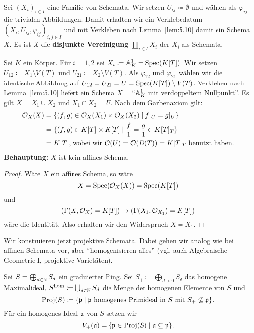 \begin{bsp}
\label{bsp:5.12}
	Sei $(X_i)_{i\in I}$ eine Familie von Schemata. Wir setzen $U_{ij}\coloneqq \emptyset$ und wählen als $\varphi_{ij}$ die trivialen Abbildungen. Damit erhalten wir ein Verklebedatum $(X_i,U_{ij},\varphi_{ij})_{i,j\in I}$ und mit Verkleben nach Lemma~\ref{lem:5.10} damit ein Schema $X$. Es ist $X$ die \textbf{disjunkte Vereinigung} $\coprod_{i\in I}X_i$ der $X_i$ als Schemata.
\end{bsp}

\begin{bsp}
\label{bsp:5.13}
	Sei $K$ ein Körper. Für $i=1,2$ sei $X_i\coloneqq \mathbb {A}^1_K = \operatorname{Spec}(K[T])$. Wir setzen $U_{12} \coloneqq X_1 \setminus V(T)$ und $U_{21}\coloneqq X_2 \setminus V(T)$. Als $\varphi_{12}$ und $\varphi_{21}$ wählen wir die identische Abbildung auf $U_{12} = U_{21} = U = \operatorname{Spec}(K[T]) \setminus V(T)$. Verkleben nach Lemma~\ref{lem:5.10} liefert ein Schema $X=$\enquote{$\mathbb {A}^1_K$ mit verdoppeltem Nullpunkt}. Es gilt $X= X_1 \cup X_2$ und $X_1 \cap X_2 = U$. Nach dem Garbenaxiom gilt:
	\begin{align*}
		\mathcal{O}_X(X) &= \{(f,g) \in \mathcal{O}_X(X_1)\times \mathcal{O}_X(X_2) \mid f\vert_U = g\vert_U\}\\
		&=\{(f,g) \in K[T] \times K[T] \mid \frac{f}{1} = \frac{g}{1} \in K[T]_T\}\\
		&= K[T]\text{, wobei wir } \mathcal{O}(U) = \mathcal{O}(D(T)) = K[T]_T \text{ benutzt haben.}
	\end{align*}
	\textbf{Behauptung:} $X$ ist kein affines Schema.
	\begin{proof}
		Wäre $X$ ein affines Schema, so wäre
		\[
			X = \operatorname{Spec}(\mathcal{O}_X(X)) = \operatorname{Spec}(K[T])
		\]
		und
		\[
			(\Gamma(X,\mathcal{O}_X) = K[T]) \to (\Gamma(X_1,\mathcal{O}_{X_1}) = K[T])
		\]
		wäre die Identität. Also erhalten wir den Widerspruch $X = X_1$.
	\end{proof}
\end{bsp}

Wir konstruieren jetzt projektive Schemata. Dabei gehen wir analog wie bei affinen Schemata vor, aber \enquote{homogenisieren alles} (vgl. auch Algebraische Geometrie I, projektive Varietäten).

\begin{defn}
\label{defn:5.14}
	Sei $S = \bigoplus_{d\in \mathbb {N}} S_d$ ein graduierter Ring. Sei $S_+ \coloneqq \bigoplus_{d > 0}S_d$ das homogene Maximalideal, $S^{\text{hom}}\coloneqq \bigcup_{d\in \mathbb {N}}S_d$ die Menge der homogenen Elemente von $S$ und
	\[
		\operatorname{Proj}(S) \coloneqq \{\mathfrak{p} \mid \mathfrak{p} \text{ homogenes Primideal in } S \text{ mit } S_+ \not \subseteq \mathfrak{p}\}.
	\]
	Für ein homogenes Ideal $\mathfrak{a}$ von $S$ setzen wir
	\[
		V_+(\mathfrak{a}) = \{\mathfrak{p} \in \operatorname{Proj}(S) \mid \mathfrak{a} \subseteq \mathfrak{p}\}.
	\]
\end{defn}

